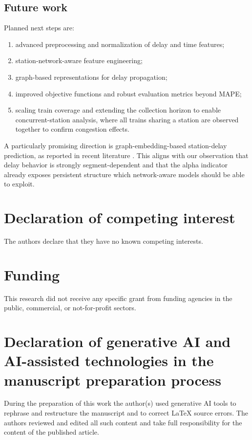 \documentclass[a4paper,fleqn]{cas-dc}
\begin{document}
\subsection{Future work}
Planned next steps are:
\begin{enumerate}
    \item advanced preprocessing and normalization of delay and time features;
    \item station-network-aware feature engineering;
    \item graph-based representations for delay propagation;
    \item improved objective functions and robust evaluation metrics beyond
          MAPE;
    \item scaling train coverage and extending the collection horizon to
          enable concurrent-station analysis, where all trains sharing a
          station are observed together to confirm congestion effects.
\end{enumerate}

A particularly promising direction is graph-embedding-based station-delay
prediction, as reported in recent literature \citep{chowdhury2025rstgcn}. This
aligns with our observation that delay behavior is strongly segment-dependent
and that the alpha indicator already exposes persistent structure which
network-aware models should be able to exploit.

\section*{Declaration of competing interest}

The authors declare that they have no known competing interests.

\section*{Funding}

This research did not receive any specific grant from funding agencies in the
public, commercial, or not-for-profit sectors.

\section*{Declaration of generative AI and AI-assisted technologies in the manuscript preparation process}

During the preparation of this work the author(s) used generative AI tools to
rephrase and restructure the manuscript and to correct LaTeX source errors. The
authors reviewed and edited all such content and take full responsibility for
the content of the published article.
\end{document}

